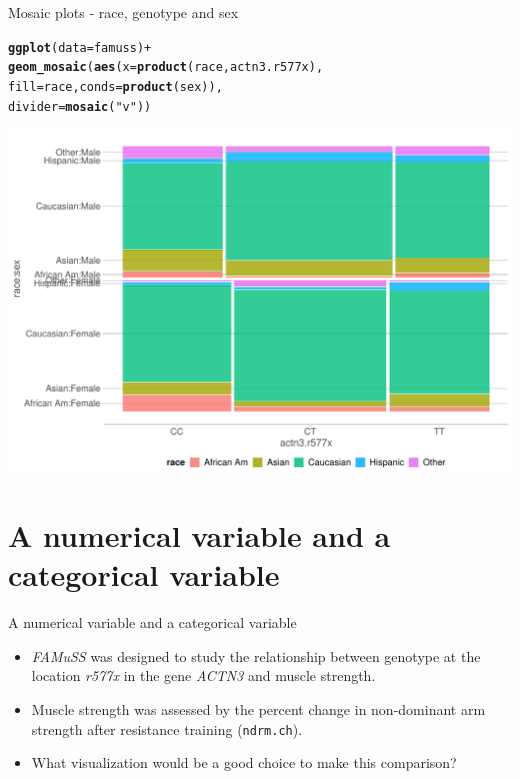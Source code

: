 \documentclass[10pt,handout]{beamer}\usepackage[]{graphicx}\usepackage[]{color}
\makeatletter
\def\maxwidth{ %
  \ifdim\Gin@nat@width>\linewidth
    \linewidth
  \else
    \Gin@nat@width
  \fi
}
\newcommand{\hlstr}[1]{\textcolor[rgb]{0.192,0.494,0.8}{#1}}%
\newcommand{\hlopt}[1]{\textcolor[rgb]{0,0,0}{#1}}%
\newcommand{\hlstd}[1]{\textcolor[rgb]{0.345,0.345,0.345}{#1}}%
\newcommand{\hlkwc}[1]{\textcolor[rgb]{0.333,0.667,0.333}{#1}}%
\newcommand{\hlkwd}[1]{\textcolor[rgb]{0.737,0.353,0.396}{\textbf{#1}}}%
\newenvironment{kframe}{%
 \def\at@end@of@kframe{}%
 \ifinner\ifhmode%
  \def\at@end@of@kframe{\end{minipage}}%
  \begin{minipage}{\columnwidth}%
 \fi\fi%
 \def\FrameCommand##1{\hskip\@totalleftmargin \hskip-\fboxsep
 \colorbox{shadecolor}{##1}\hskip-\fboxsep
     \hskip-\linewidth \hskip-\@totalleftmargin \hskip\columnwidth}%
 \MakeFramed {\advance\hsize-\width
   \@totalleftmargin\z@ \linewidth\hsize
   \@setminipage}}%
 {\par\unskip\endMakeFramed%
 \at@end@of@kframe}
\newenvironment{knitrout}{}{} %
\makeatother
\begin{document}
\begin{frame}[fragile]{Mosaic plots - race, genotype and sex}
\begin{knitrout}\tiny
{}\color{fgcolor}\begin{kframe}
\begin{alltt}
    \hlkwd{ggplot}\hlstd{(}\hlkwc{data} \hlstd{= famuss)} \hlopt{+}
      \hlkwd{geom_mosaic}\hlstd{(}\hlkwd{aes}\hlstd{(}\hlkwc{x} \hlstd{=} \hlkwd{product}\hlstd{(race, actn3.r577x),}
                      \hlkwc{fill} \hlstd{= race,} \hlkwc{conds} \hlstd{=} \hlkwd{product}\hlstd{(sex)),}
                      \hlkwc{divider} \hlstd{=} \hlkwd{mosaic}\hlstd{(}\hlstr{"v"}\hlstd{))}
\end{alltt}
\end{kframe}

{\centering \includegraphics[width=\maxwidth]{figure/mosaic-2-1} 

}


\end{knitrout}
	
\end{frame}



\section{A numerical variable and a categorical variable}

\begin{frame}{A numerical variable and a categorical variable}
	\protect\hypertarget{a-numerical-variable-and-a-categorical-variable}{}
	
	\begin{itemize}
		\item \emph{FAMuSS} was designed to study the relationship between genotype at
	the location \emph{r577x} in the gene \emph{ACTN3} and muscle strength.
	
	\item Muscle strength was assessed by the percent change in non-dominant arm
	strength after resistance training (\texttt{ndrm.ch}).
	
	\item What visualization would be a good choice to make this comparison?
	\end{itemize}
	
\end{frame}
\end{document}
